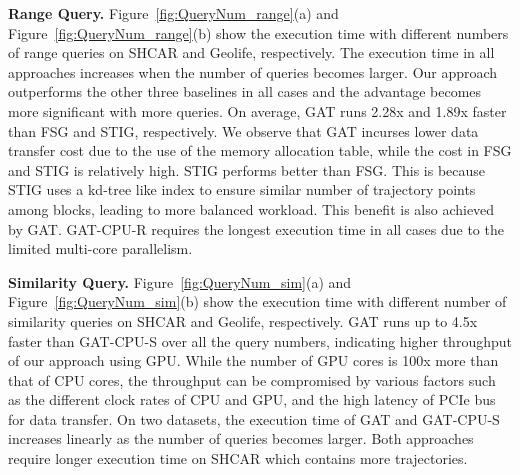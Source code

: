 \documentclass[10pt,conference,letterpaper]{IEEEtran}
\newcommand{\frname}{GAT\xspace }
\begin{document}
\vspace{0.1cm}\textbf{Range Query.}
Figure~\ref{fig:QueryNum_range}(a) and Figure~\ref{fig:QueryNum_range}(b) show the execution time with different numbers of range queries on SHCAR and Geolife, respectively. The execution time in all approaches increases when the number of queries becomes larger.
Our approach outperforms the other three baselines in all cases and the advantage becomes more significant with more queries.
On average, \frname runs 2.28x and 1.89x faster than FSG and STIG, respectively. We observe that GAT incurses lower data transfer cost due to the use of the memory allocation table, while the cost in FSG and STIG is relatively high.
STIG performs better than FSG. This is because STIG uses a kd-tree like index to ensure similar number of trajectory points among blocks, leading to more balanced workload. This benefit is also achieved by \frname. \frname-CPU-R requires the longest execution time in all cases due to the limited multi-core parallelism.



\vspace{0.1cm}\textbf{Similarity Query.}
Figure~\ref{fig:QueryNum_sim}(a) and Figure~\ref{fig:QueryNum_sim}(b) show the execution time with different number of similarity queries on SHCAR and Geolife, respectively. \frname runs up to 4.5x faster than \frname-CPU-S over all the query numbers, indicating higher throughput of our approach using GPU. While the number of GPU cores is 100x more than that of CPU cores, the throughput can be compromised by various factors such as the different clock rates of CPU and GPU, and the high latency of PCIe bus for data transfer.
On two datasets, the execution time of \frname and \frname-CPU-S increases linearly as the number of queries becomes larger. Both approaches require longer execution time on SHCAR which contains more trajectories.
\end{document}
